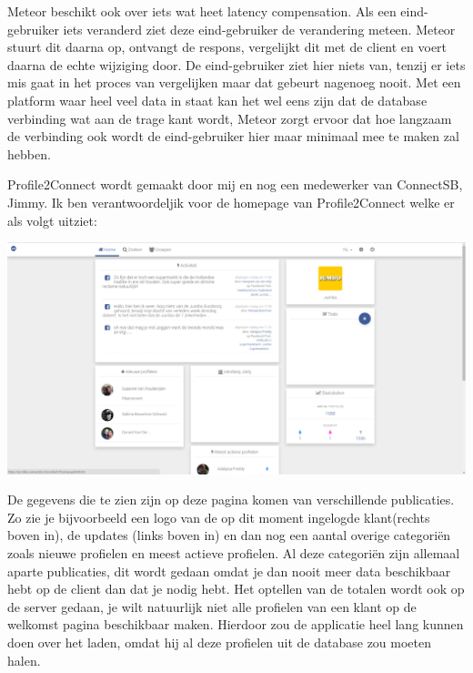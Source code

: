 \newline

Meteor beschikt ook over iets wat heet latency compensation. Als een eind-gebruiker iets veranderd ziet deze eind-gebruiker de verandering meteen. Meteor stuurt dit daarna op, ontvangt de respons, vergelijkt dit met de client en voert daarna de echte wijziging door. De eind-gebruiker ziet hier niets van, tenzij er iets mis gaat in het proces van vergelijken maar dat gebeurt nagenoeg nooit. Met een platform waar heel veel data in staat kan het wel eens zijn dat de database verbinding wat aan de trage kant wordt, Meteor zorgt ervoor dat hoe langzaam de verbinding ook wordt de eind-gebruiker hier maar minimaal mee te maken zal hebben.

\newline

Profile2Connect wordt gemaakt door mij en nog een medewerker van ConnectSB, Jimmy. Ik ben verantwoordeljik voor de homepage van Profile2Connect welke er als volgt uitziet:

\begin{center}
\includegraphics[scale=0.2]{profile2connect}
\end{center}


De gegevens die te zien zijn op deze pagina komen van verschillende publicaties. Zo zie je bijvoorbeeld een logo van de op dit moment ingelogde klant(rechts boven in), de updates (links boven in) en dan nog een aantal overige categoriën zoals nieuwe profielen en meest actieve profielen. Al deze categoriën zijn allemaal aparte publicaties, dit wordt gedaan omdat je dan nooit meer data beschikbaar hebt op de client dan dat je nodig hebt. Het optellen van de totalen wordt ook op de server gedaan, je wilt natuurlijk niet alle profielen van een klant op de welkomst pagina beschikbaar maken. Hierdoor zou de applicatie heel lang kunnen doen over het laden, omdat hij al deze profielen uit de database zou moeten halen.

